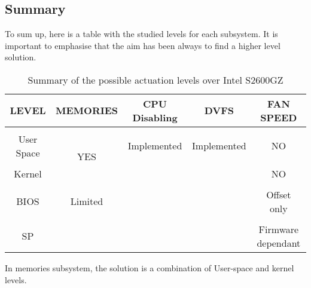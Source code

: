 \subsection{Summary}

To sum up, here is a table with the studied levels for each subsystem. It is important to emphasise that the aim has been always to find a higher level solution.


\begin{table}[H]
\centering
\label{my-label}
\begin{tabular}{c|cccc}
LEVEL & MEMORIES & CPU Disabling & DVFS & FAN SPEED\\ %
\hline \\
User Space & \multirow{3}{*}{YES} & Implemented & Implemented & NO \\ \\
Kernel  &                   &  &  & NO \\ \\
BIOS &      Limited             &  &  & Offset only \\ \\
SP &                   &  &  & Firmware dependant \\ 
\end{tabular}
\caption{Summary of the possible actuation levels over Intel S2600GZ}
\end{table}

In memories subsystem, the solution is a combination of User-space and kernel levels.



